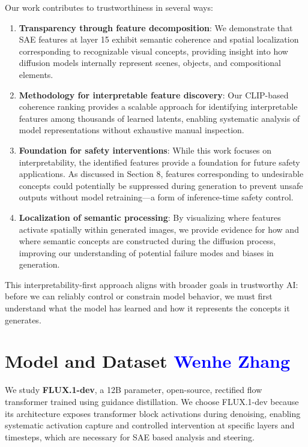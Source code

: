 \documentclass{article}
\begin{document}
Our work contributes to trustworthiness in several ways:
\begin{enumerate}
    \item \textbf{Transparency through feature decomposition}: We demonstrate that SAE features at layer 15 exhibit semantic coherence and spatial localization corresponding to recognizable visual concepts, providing insight into how diffusion models internally represent scenes, objects, and compositional elements.
    
    \item \textbf{Methodology for interpretable feature discovery}: Our CLIP-based coherence ranking provides a scalable approach for identifying interpretable features among thousands of learned latents, enabling systematic analysis of model representations without exhaustive manual inspection.
    
    \item \textbf{Foundation for safety interventions}: While this work focuses on interpretability, the identified features provide a foundation for future safety applications. As discussed in Section 8, features corresponding to undesirable concepts could potentially be suppressed during generation to prevent unsafe outputs without model retraining---a form of inference-time safety control.
    
    \item \textbf{Localization of semantic processing}: By visualizing where features activate spatially within generated images, we provide evidence for how and where semantic concepts are constructed during the diffusion process, improving our understanding of potential failure modes and biases in generation.
\end{enumerate}

This interpretability-first approach aligns with broader goals in trustworthy AI: before we can reliably control or constrain model behavior, we must first understand what the model has learned and how it represents the concepts it generates.

\section{Model and Dataset \textcolor{blue}{Wenhe Zhang}}

We study \textbf{FLUX.1-dev}, a 12B parameter, open-source, rectified flow transformer trained using guidance distillation. We choose FLUX.1-dev because its architecture exposes transformer block activations during denoising, enabling systematic activation capture and controlled intervention at specific layers and timesteps, which are necessary for SAE based analysis and steering.
\end{document}
